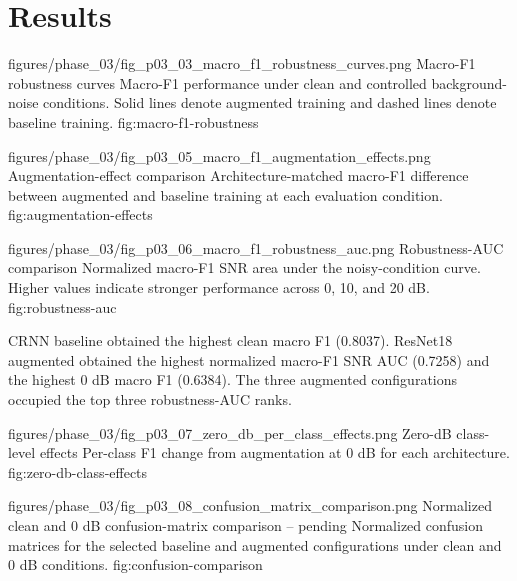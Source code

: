 \section{Results}





\ProjectFigure
  {figures/phase_03/fig_p03_03_macro_f1_robustness_curves.png}
  {\columnwidth}
  {Macro-F1 robustness curves}
  {Macro-F1 performance under clean and controlled background-noise
  conditions. Solid lines denote augmented training and dashed lines denote
  baseline training.}
  {fig:macro-f1-robustness}

\ProjectFigure
  {figures/phase_03/fig_p03_05_macro_f1_augmentation_effects.png}
  {\columnwidth}
  {Augmentation-effect comparison}
  {Architecture-matched macro-F1 difference between augmented and baseline
  training at each evaluation condition.}
  {fig:augmentation-effects}

\ProjectFigure
  {figures/phase_03/fig_p03_06_macro_f1_robustness_auc.png}
  {\columnwidth}
  {Robustness-AUC comparison}
  {Normalized macro-F1 SNR area under the noisy-condition curve. Higher values
  indicate stronger performance across 0, 10, and 20 dB.}
  {fig:robustness-auc}

CRNN baseline obtained the highest clean macro F1 (0.8037). ResNet18 augmented
obtained the highest normalized macro-F1 SNR AUC (0.7258) and the highest 0 dB
macro F1 (0.6384). The three augmented configurations occupied the top three
robustness-AUC ranks.

\ProjectFigure
  {figures/phase_03/fig_p03_07_zero_db_per_class_effects.png}
  {\columnwidth}
  {Zero-dB class-level effects}
  {Per-class F1 change from augmentation at 0 dB for each architecture.}
  {fig:zero-db-class-effects}

\ProjectFigure
  {figures/phase_03/fig_p03_08_confusion_matrix_comparison.png}
  {\columnwidth}
  {Normalized clean and 0 dB confusion-matrix comparison -- pending}
  {Normalized confusion matrices for the selected baseline and augmented
  configurations under clean and 0 dB conditions.}
  {fig:confusion-comparison}

